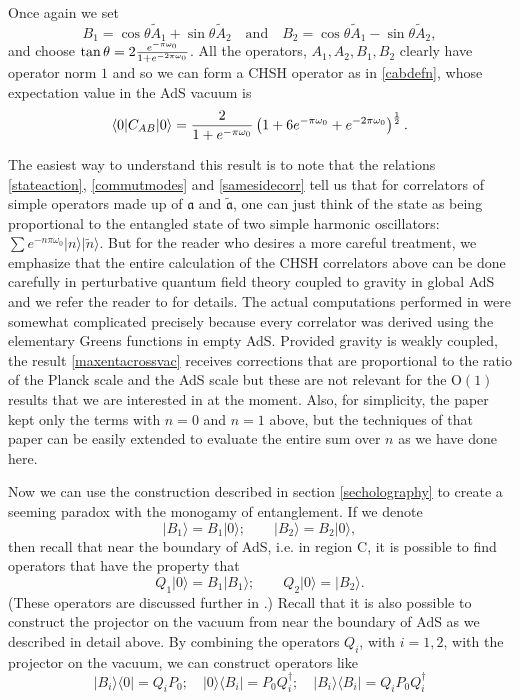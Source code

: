 \documentclass[12pt]{article}
\def\Or[#1]{{\text{O}}\left({#1}\right)}
\newcommand{\be}{\begin{equation}}
\newcommand{\ee}{\end{equation}}
\def \anh {\mathfrak{a}}
\def \tildanh {\widetilde{\mathfrak{a}}}
\def\projvac{{\cal P}_{\Omega}}
\def\projvac{P_0}
\begin{document}
Once again we set
\be
B_1 = \cos \theta \widetilde{A}_1 + \sin \theta \widetilde{A}_2  \quad \text{and}  \quad B_2 = \cos \theta \widetilde{A}_1 - \sin \theta \widetilde{A}_2,
\ee
and choose $\tan \theta = 2 {e^{-{\pi \omega_0}} \over 1 + e^{-{2 \pi \omega_0}}}$. All the operators, $A_1, A_2, B_1, B_2$ clearly have operator norm $1$ and so we can form a CHSH operator as in \eqref{cabdefn}, whose expectation value in the AdS vacuum is
\be
\label{maxentacrossvac}
\langle 0 | C_{AB} | 0  \rangle = {2 \over 1 + e^{-\pi \omega_0}} \left(1 + 6 e^{-{\pi \omega_0}} + e^{-2 \pi \omega_0} \right)^{1 \over 2}.
\ee

The easiest way to understand this result is to note that the relations \eqref{stateaction}, \eqref{commutmodes} and \eqref{samesidecorr} tell us that for correlators of simple operators made up of $\anh$ and $\tildanh$, one can just think of the state as being proportional to the  entangled state of two simple harmonic oscillators: $ \sum e^{-n \pi \omega_0} |n \rangle |\widetilde{n} \rangle$. But for the reader who desires a more careful treatment, we emphasize that the entire calculation of the CHSH correlators above can be done carefully in perturbative quantum field theory coupled to gravity in global AdS and we refer the reader to \cite{Raju:2018zpn} for details. The actual computations performed in \cite{Raju:2018zpn} were somewhat complicated precisely because every correlator was derived using the elementary Greens functions in empty AdS.  Provided gravity is weakly coupled, the result \eqref{maxentacrossvac} receives corrections that are proportional to the ratio of the Planck scale and the AdS scale but these are not relevant for the $\Or[1]$ results that we are interested in at the moment. Also, for simplicity, the paper \cite{Raju:2018zpn} kept only the terms with $n=0$ and $n=1$ above, but the techniques of that paper can be easily extended to evaluate the entire sum over $n$ as we have done here.


Now we can use the construction described in section \ref{secholography} to create a seeming paradox with the monogamy of entanglement. If we denote
\be
|B_1 \rangle = B_1 |0 \rangle; \qquad |B_2 \rangle = B_2 | 0 \rangle,
\ee
then recall that near the boundary of AdS, i.e. in region C, it is possible to find operators that have the property that
\be
Q_1 | 0 \rangle = B_1 |B_1 \rangle; \qquad Q_2 | 0 \rangle = |B_2 \rangle. 
\ee
(These operators are discussed further in \cite{Raju:2018zpn}.)
Recall that it is also possible to construct the projector on the vacuum from near the boundary of AdS as we described in detail above. By combining the operators $Q_i$, with $i=1,2$, with the projector on the vacuum, we can construct operators like
\be
|B_i \rangle \langle 0| = Q_i \projvac; \quad |0 \rangle \langle B_i| = \projvac Q_i^{\dagger}; \quad |B_i \rangle \langle B_i | = Q_i \projvac Q_i^{\dagger}
\ee
\end{document}
